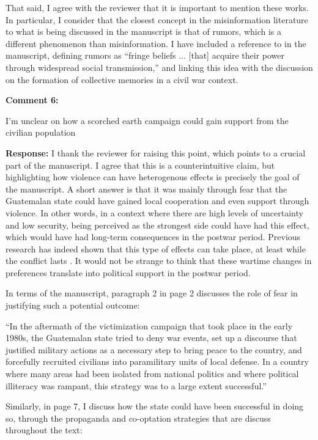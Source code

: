\documentclass[12pt, a4paper, notitlepage]{article}
\begin{document}
That said, I agree with the reviewer that it is important to mention these works. In particular, I consider that the closest concept in the misinformation literature to what is being discussed in the manuscript is that of rumors, which is a different phenomenon than misinformation. I have included a reference to \citet[243]{Berinsky:2017ty} in the manuscript, defining rumors as ``fringe beliefs ... [that] acquire their power through widespread social transmission,'' and linking this idea with the discussion on the formation of collective memories in a civil war context.

\vspace{15pt}
\noindent\textbf{Comment 6:}
\begin{displayquote}
I'm unclear on how a scorched earth campaign could gain support from the civilian population
\end{displayquote}

\noindent\textbf{Response:} I thank the reviewer for raising this point, which points to a crucial part of the manuscript. I agree that this is a counterintuitive claim, but highlighting how violence can have heterogenous effects is precisely the goal of the manuscript.
A short answer is that it was mainly through fear that the Guatemalan state could have gained local cooperation and even support through violence. In other words, in a context where there are high levels of uncertainty and low security, being perceived as the strongest side could have had this effect, which would have had long-term consequences in the postwar period.
Previous research has indeed shown that this type of effects can take place, at least while the conflict lasts \citep{Schubiger:2021aa}.
It would not be strange to think that these wartime changes in preferences translate into political support in the postwar period.

In terms of the manuscript, paragraph 2 in page 2 discusses the role of fear in justifying such a potential outcome:

``In the aftermath of the victimization campaign that took place in the early 1980s, the Guatemalan state tried to deny war events, set up a discourse that justified military actions as a necessary step to bring peace to the country, and forcefully recruited civilians into paramilitary units of local defense.
In a country where many areas had been isolated from national politics and where political illiteracy was rampant, this strategy was to a large extent successful.''

Similarly, in page 7, I discuss how the state could have been successful in doing so, through the propaganda and co-optation strategies that are discuss throughout the text:
\end{document}
